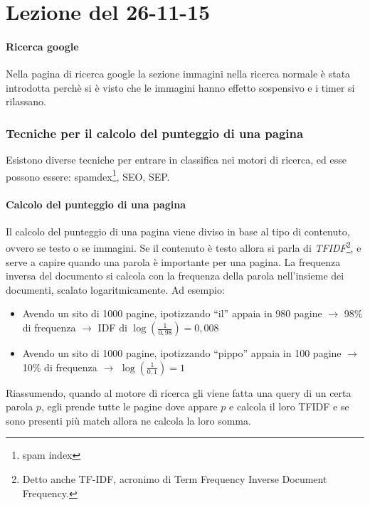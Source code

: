 \section{Lezione del 26-11-15}

\paragraph*{Ricerca google}Nella pagina di ricerca google la sezione immagini nella ricerca normale \`e stata introdotta perch\`e si \`e visto che le immagini hanno effetto sospensivo e i timer si rilassano.

\subsubsection{Tecniche per il calcolo del punteggio di una pagina}
Esistono diverse tecniche per entrare in classifica nei motori di ricerca, ed esse possono essere: spamdex\footnote{spam index}, SEO, SEP.

\paragraph*{Calcolo del punteggio di una pagina}Il calcolo del punteggio di una pagina viene diviso in base al tipo di contenuto, ovvero se testo o se immagini. Se il contenuto \`e testo allora si parla di \textit{TFIDF}\footnote{Detto anche TF-IDF, acronimo di Term Frequency Inverse Document Frequency.}, e serve a capire quando una parola \`e importante per una pagina. La frequenza inversa del documento si calcola con la frequenza della parola nell'insieme dei documenti, scalato logaritmicamente.
Ad esempio:
\begin{itemize}

\item Avendo un sito di 1000 pagine, ipotizzando ``il'' appaia in 980 pagine $\to$ 98\% di frequenza $\to$ IDF di $\log(\frac{1}{0,98}) = 0,008$
\item Avendo un sito di 1000 pagine, ipotizzando ``pippo'' appaia in 100 pagine $\to$ 10\% di frequenza $\to$ $\log( \frac{1}{0,1}) = 1 $
\end{itemize}

Riassumendo, quando al motore di ricerca gli viene fatta una query di un certa parola $p$, egli prende tutte le pagine dove appare $p$ e calcola il loro TFIDF e se sono presenti pi\`u match allora ne calcola la loro somma.

